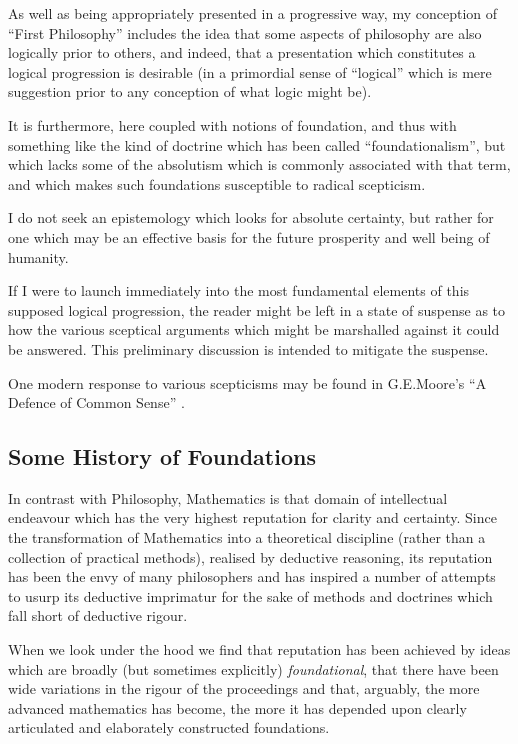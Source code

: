 \documentclass[10pt,titlepage]{book}
\begin{document}
As well as being appropriately presented in a progressive way, my conception of ``First Philosophy'' includes the idea that some aspects of philosophy are also logically prior to others, and indeed, that a presentation which constitutes a logical progression is desirable (in a primordial sense of ``logical'' which is mere suggestion prior to any conception of what logic might be).

It is furthermore, here coupled with notions of foundation, and thus with something like the kind of doctrine which has been called ``foundationalism'', but which lacks some of the absolutism which is commonly associated with that term, and which makes such foundations susceptible to radical scepticism.

I do not seek an epistemology which looks for absolute certainty, but rather for one which may be an effective basis for the future prosperity and well being of humanity.

If I were to launch immediately into the most fundamental elements of this supposed logical progression, the reader might be left in a state of suspense as to how the various sceptical arguments which might be marshalled against it could be answered.
This preliminary discussion is intended to mitigate the suspense.

One modern response to various scepticisms may be found in G.E.Moore's ``A Defence of Common Sense'' \cite{moore1925,moore1993}.

\subsection{Some History of Foundations}

In contrast with Philosophy, Mathematics is that domain of intellectual endeavour which has the very highest reputation for clarity and certainty.
Since the transformation of Mathematics into a theoretical discipline (rather than a collection of practical methods), realised by deductive reasoning, its reputation has been the envy of many philosophers and has inspired a number of attempts to usurp its deductive imprimatur for the sake of methods and doctrines which fall short of deductive rigour.

When we look under the hood we find that reputation has been achieved by ideas which are broadly (but sometimes explicitly) \emph{foundational}, that there have been wide variations in the rigour of the proceedings and that, arguably, the more advanced mathematics has become, the more it has depended upon clearly articulated and elaborately constructed foundations.
\end{document}
